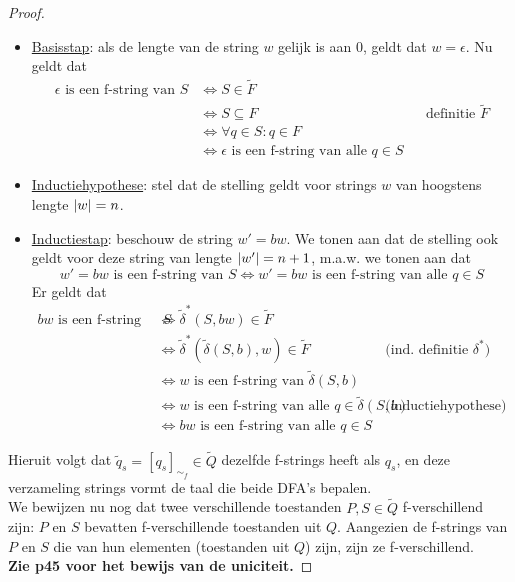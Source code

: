 \documentclass[../aanvullingen_cursus.tex]{subfiles}
\begin{document}
\begin{proof}
	\begin{itemize}
		\item \underline{Basisstap}: als de lengte van de string \(w\) gelijk is aan 0, geldt dat \(w=\epsilon\). Nu geldt dat
		\begin{align*}
				\epsilon \text{ is een f-string van } S &\Leftrightarrow S \in \tilde{F} \\
				&\Leftrightarrow S \subseteq F && \text{definitie } \tilde{F} \\
				&\Leftrightarrow \forall q \in S : q \in F \\
				&\Leftrightarrow \epsilon \text{ is een f-string van alle } q \in S
		\end{align*}
		\item \underline{Inductiehypothese}: stel dat de stelling geldt voor strings \(w\) van hoogstens lengte \(\lvert w \rvert=n\).
		\item \underline{Inductiestap}: beschouw de string \(w'=bw\). We tonen aan dat de stelling ook geldt voor deze string van lengte \(\lvert w' \rvert=n+1\), m.a.w. we tonen aan dat \[w'=bw \text{ is een f-string van } S \Leftrightarrow w'=bw \text{ is een f-string van alle } q\in S \]Er geldt dat
		\begin{align*}
			bw \text{ is een f-string van } S &\Leftrightarrow \tilde{\delta}^*(S,bw) \in \tilde{F} \\
			&\Leftrightarrow \tilde{\delta}^*\left(\tilde{\delta}(S,b),w\right) \in \tilde{F} && \text{(ind. definitie } \delta^*\text{)} \\
			&\Leftrightarrow w \text{ is een f-string van } \tilde{\delta}(S,b)\\
			&\Leftrightarrow w \text{ is een f-string van alle } q \in \tilde{\delta}(S,b) && \text{(inductiehypothese)} \\
			&\Leftrightarrow bw \text{ is een f-string van alle } q \in S
		\end{align*}
	\end{itemize}

	Hieruit volgt dat \(\tilde{q}_s = [q_s]_{\sim_f} \in \tilde{Q}\) dezelfde f-strings heeft als \(q_s\), en deze verzameling strings vormt de taal die beide DFA's bepalen.\\

	We bewijzen nu nog dat twee verschillende toestanden \(P,S \in \tilde{Q}\) f-verschillend zijn: \(P\) en \(S\) bevatten f-verschillende toestanden uit \(Q\). Aangezien de f-strings van \(P\) en \(S\) die van hun elementen (toestanden uit \(Q\)) zijn, zijn ze f-verschillend.\\

	\textbf{Zie p45 voor het bewijs van de uniciteit.}

\end{proof}
\end{document}
